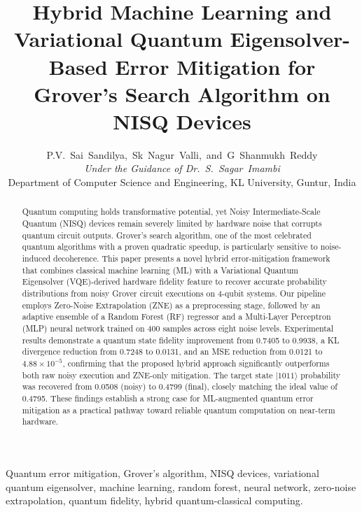 \documentclass[journal]{IEEEtran}
\begin{document}
\title{Hybrid Machine Learning and Variational Quantum Eigensolver-Based Error Mitigation for Grover's Search Algorithm on NISQ Devices}

\author{
P.V.~Sai~Sandilya,~Sk~Nagur~Valli,~and~G~Shanmukh~Reddy\\
\textit{Under the Guidance of Dr.~S.~Sagar~Imambi}\\
Department of Computer Science and Engineering,
KL University, Guntur, India
}

\maketitle

\begin{abstract}
Quantum computing holds transformative potential, yet Noisy Intermediate-Scale Quantum (NISQ) devices remain severely limited by hardware noise that corrupts quantum circuit outputs. Grover's search algorithm, one of the most celebrated quantum algorithms with a proven quadratic speedup, is particularly sensitive to noise-induced decoherence. This paper presents a novel hybrid error-mitigation framework that combines classical machine learning (ML) with a Variational Quantum Eigensolver (VQE)-derived hardware fidelity feature to recover accurate probability distributions from noisy Grover circuit executions on 4-qubit systems. Our pipeline employs Zero-Noise Extrapolation (ZNE) as a preprocessing stage, followed by an adaptive ensemble of a Random Forest (RF) regressor and a Multi-Layer Perceptron (MLP) neural network trained on 400 samples across eight noise levels. Experimental results demonstrate a quantum state fidelity improvement from 0.7405 to 0.9938, a KL divergence reduction from 0.7248 to 0.0131, and an MSE reduction from 0.0121 to $4.88 \times 10^{-5}$, confirming that the proposed hybrid approach significantly outperforms both raw noisy execution and ZNE-only mitigation. The target state $|1011\rangle$ probability was recovered from 0.0508 (noisy) to 0.4799 (final), closely matching the ideal value of 0.4795. These findings establish a strong case for ML-augmented quantum error mitigation as a practical pathway toward reliable quantum computation on near-term hardware.
\end{abstract}

\begin{IEEEkeywords}
Quantum error mitigation, Grover's algorithm, NISQ devices, variational quantum eigensolver, machine learning, random forest, neural network, zero-noise extrapolation, quantum fidelity, hybrid quantum-classical computing.
\end{IEEEkeywords}
\end{document}
